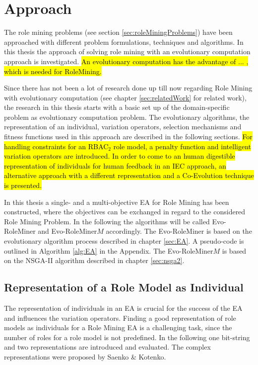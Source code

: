 \newpage
\chapter{Approach}
\label{sec:approach}
The role mining problems (see section \ref{sec:roleMiningProblems}) have been approached with different problem formulations, techniques and algorithms. In this thesis the approach of solving role mining with an evolutionary computation approach is investigated. \hl{An evolutionary computation has the advantage of ... , which is needed for RoleMining.}

Since there has not been a lot of research done up till now regarding Role Mining with evolutionary computation (see chapter \ref{sec:relatedWork} for related work), the research in this thesis starts with a basic set up of the domain-specific problem as evolutionary computation problem. The evolutionary algorithms, the representation of an individual, variation operators, selection mechanisms and fitness functions used in this approach are described in the following sections. \hl{For handling constraints for an RBAC$_2$ role model, a penalty function and intelligent variation operators are introduced. In order to come to an human digestible representation of individuals for human feedback in an IEC approach, an alternative approach with a different representation and a Co-Evolution technique is presented.}

In this thesis a single- and a multi-objective EA for Role Mining has been constructed, where the objectives can be exchanged in regard to the considered Role Mining Problem. In the following the algorithms will be called Evo-RoleMiner and Evo-RoleMiner$M$ accordingly.
The Evo-RoleMiner is based on the evolutionary algorithm process described in chapter \ref{sec:EA}. A pseudo-code is outlined in Algorithm \ref{alg:EA} in the Appendix. The Evo-RoleMiner$M$ is based on the NSGA-II algorithm described in chapter \ref{sec:nsga2}.
    
    \section{Representation of a Role Model as Individual}
    The representation of individuals in an EA is crucial for the success of the EA and influences the variation operators. Finding a good representation of role models as individuals for a Role Mining EA is a challenging task, since the number of roles for a role model is not predefined. In the following one bit-string and two representations are introduced and evaluated. The complex representations were proposed by Saenko \& Kotenko\cite{saenko2012design}.
    
